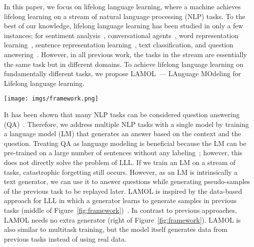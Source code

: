 \documentclass{article} \usepackage{iclr2020_conference,times}
\begin{document}
In this paper, we focus on lifelong language learning, where a machine achieves lifelong learning on a stream of natural language processing (NLP) tasks.
To the best of our knowledge, lifelong language learning has been studied in only a few instances; 
for sentiment analysis~\citep{chen-etal-2015-lifelong,8101496}, conversational agents~\citep{LLL_chatbot}, word representation learning~\citep{LLL_word}, sentence representation learning~\citep{Liu2019ContinualLF}, text classification, and question answering~\citep{d2019episodic}.
However, in all previous work, the tasks in the stream are essentially the same task but in different domains.
To achieve lifelong language learning on fundamentally different tasks, we propose LAMOL~--- LAnguage MOdeling for Lifelong language learning.

\begin{figure*}[!htp]
    \centering
    \texttt{[image: imgs/framework.png]}
    \caption{\textbf{Left}: After learning Task 2, the learner has already forgetten how to solve Task 1. This is ``catastrophic forgetting''. 
    \textbf{Middle}: The basic idea of the data-based LLL approach. A generator is learned to generate examples it has seen before. Using the generator, the learner also learns from examples from the previous task to prevent it from forgetting.
    \textbf{Right}: A language model that simultaneously takes on the roles of learner and generator.}
  \label{fig:framework}
\end{figure*}     
It has been shown that many NLP tasks can be considered question answering (QA)~\citep{McCann2018decaNLP}.
Therefore, we address multiple NLP tasks with a single model by training a language model (LM) that generates an answer based on the context and the question.  
Treating QA as language modeling is beneficial because the LM can be pre-trained on a large number of sentences without any labeling~\citep{radford2019language}; however, this does not directly solve the problem of LLL.
If we train an LM on a stream of tasks, catastrophic forgetting still occurs. 
However, as an LM is intrinsically a text generator, we can use it to answer questions while generating pseudo-samples of the previous task to be replayed later.
LAMOL is inspired by the data-based approach for LLL in which a generator learns to generate samples in previous tasks (middle of Figure~\ref{fig:framework})~\citep{shin2017continual,kemker2017fearnet}.
In contrast to previous approaches, LAMOL needs no extra generator (right of Figure~\ref{fig:framework}).
LAMOL is also similar to multitask training, but the model itself generates data from previous tasks instead of using real data.
\end{document}
